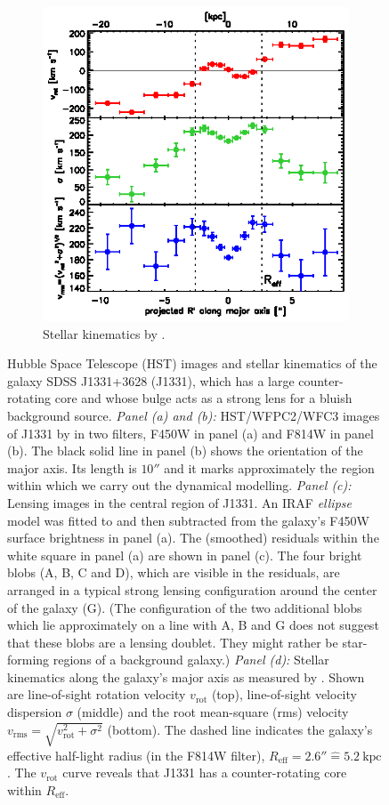 \documentclass[useAMS,usenatbib]{mnras}
\begin{document}
\begin{figure}
\begin{subfigure}{.5\textwidth}
\end{subfigure}%
\begin{subfigure}{.5\textwidth}
  \centering
  \includegraphics[width=.9\linewidth]{fig/stellar_kinematics_data.ps}
  \caption{Stellar kinematics by \citet{SWELLSV}.}
  \label{fig:kinematics}
\end{subfigure}
\caption{Hubble Space Telescope (HST) images and stellar kinematics of the galaxy SDSS J1331+3628 (J1331), which has a large counter-rotating core and whose bulge acts as a strong lens for a bluish background source. \emph{Panel (a) and (b):} HST/WFPC2/WFC3 images of J1331 by \citet{SWELLSI} in two filters, F450W in panel (a) and F814W in panel (b). The black solid line in panel (b) shows the orientation of the major axis. Its length is $10''$ and it marks approximately the region within which we carry out the dynamical modelling. \emph{Panel (c):} Lensing images in the central region of J1331.  An IRAF \emph{ellipse} model was fitted to and then subtracted from the galaxy's F450W surface brightness in panel (a). The (smoothed) residuals within the white square in panel (a) are shown in panel (c). The four bright blobs (A, B, C and D), which are visible in the residuals, are arranged in a typical strong lensing configuration around the center of the galaxy (G). (The configuration of the two additional blobs which lie approximately on a line with A, B and G does not suggest that these blobs are a lensing doublet. They might rather be star-forming regions of a background galaxy.) \emph{Panel (d):} Stellar kinematics along the galaxy's major axis as measured by \citet{SWELLSV}. Shown are line-of-sight rotation velocity $v_\text{rot}$ (top), line-of-sight velocity dispersion $\sigma$ (middle) and the root mean-square (rms) velocity $v_\text{rms} = \sqrt{v_\text{rot}^2 + \sigma^2}$ (bottom). The dashed line indicates the galaxy's effective half-light radius (in the F814W filter), $R_\text{eff} = 2.6'' \hat{=} 5.2~\text{kpc}$. The $v_\text{rot}$ curve reveals that J1331 has a counter-rotating core within $R_\text{eff}$.}
\label{fig:specialJ1331}
\end{figure}
\end{document}
